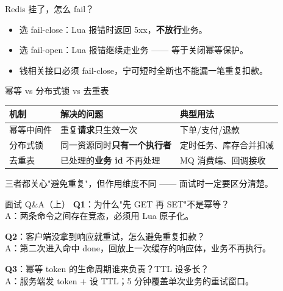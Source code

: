 \begin{frame}{Redis 挂了，怎么 fail？}
\begin{itemize}
  \item 选 fail-close：Lua 报错时返回 5xx，\textbf{不放行}业务。
  \item 选 fail-open：Lua 报错继续走业务 —— 等于关闭幂等保护。
  \item 钱相关接口必须 fail-close，宁可短时全断也不能漏一笔重复扣款。
\end{itemize}
\vspace{2mm}
\end{frame}

\begin{frame}{幂等 vs 分布式锁 vs 去重表}
\begin{tabular}{@{}lll@{}}
\toprule
机制 & 解决的问题 & 典型用法 \\
\midrule
幂等中间件 & 重复\textbf{请求}只生效一次 & 下单/支付/退款 \\
分布式锁 & 同一资源同时\textbf{只有一个执行者} & 定时任务、库存合并扣减 \\
去重表 & 已处理的\textbf{业务 id} 不再处理 & MQ 消费端、回调接收 \\
\bottomrule
\end{tabular}
\vspace{3mm}
\small 三者都关心"避免重复"，但作用维度不同 —— 面试时一定要区分清楚。
\end{frame}

\appendix

\begin{frame}{面试 Q\&A（上）}
\textbf{Q1}：为什么"先 GET 再 SET"不是幂等？\\
\hspace{4mm}\small A：两条命令之间存在竞态，必须用 Lua 原子化。

\vspace{2mm}
\textbf{Q2}：客户端没拿到响应就重试，怎么避免重复扣款？\\
\hspace{4mm}\small A：第二次进入命中 done，回放上一次缓存的响应体，业务不再执行。

\vspace{2mm}
\textbf{Q3}：幂等 token 的生命周期谁来负责？TTL 设多长？\\
\hspace{4mm}\small A：服务端发 token + 设 TTL；5 分钟覆盖单次业务的重试窗口。
\end{frame}

